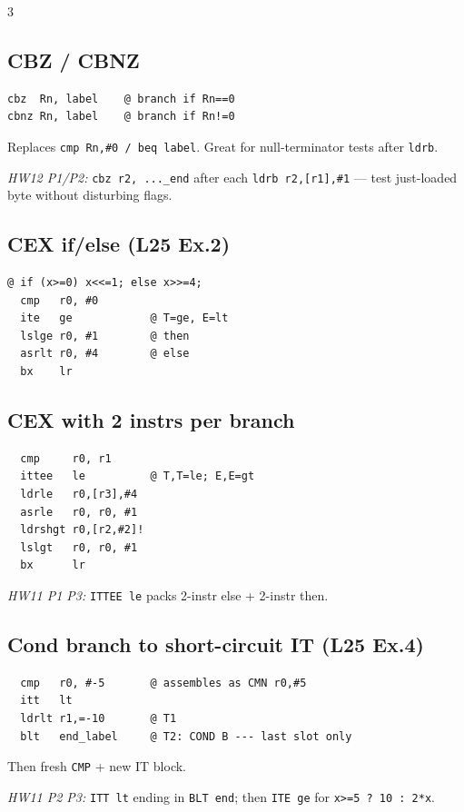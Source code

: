 \documentclass[8pt,landscape]{extarticle}
\newcommand{\asm}[1]{\texttt{\scriptsize #1}}
\newcommand{\cee}[1]{\texttt{\scriptsize #1}}
\begin{document}
\begin{multicols*}{3}
\subsection{CBZ / CBNZ}
\begin{lstlisting}
cbz  Rn, label    @ branch if Rn==0
cbnz Rn, label    @ branch if Rn!=0
\end{lstlisting}
Replaces \asm{cmp Rn,\#0 / beq label}. Great for null-terminator tests after \asm{ldrb}.

\textit{HW12 P1/P2:} \asm{cbz r2, ..._end} after each \asm{ldrb r2,[r1],\#1} --- test just-loaded byte without disturbing flags.

\subsection{CEX if/else (L25 Ex.2)}
\begin{lstlisting}
@ if (x>=0) x<<=1; else x>>=4;
  cmp   r0, #0
  ite   ge            @ T=ge, E=lt
  lslge r0, #1        @ then
  asrlt r0, #4        @ else
  bx    lr
\end{lstlisting}

\subsection{CEX with 2 instrs per branch}
\begin{lstlisting}
  cmp     r0, r1
  ittee   le          @ T,T=le; E,E=gt
  ldrle   r0,[r3],#4
  asrle   r0, r0, #1
  ldrshgt r0,[r2,#2]!
  lslgt   r0, r0, #1
  bx      lr
\end{lstlisting}
\textit{HW11 P1 P3:} \asm{ITTEE le} packs 2-instr else + 2-instr then.

\subsection{Cond branch to short-circuit IT (L25 Ex.4)}
\begin{lstlisting}
  cmp   r0, #-5       @ assembles as CMN r0,#5
  itt   lt
  ldrlt r1,=-10       @ T1
  blt   end_label     @ T2: COND B --- last slot only
\end{lstlisting}
Then fresh \asm{CMP} + new IT block.

\textit{HW11 P2 P3:} \asm{ITT lt} ending in \asm{BLT end}; then \asm{ITE ge} for \cee{x>=5 ? 10 : 2*x}.


\end{multicols*}
\end{document}
